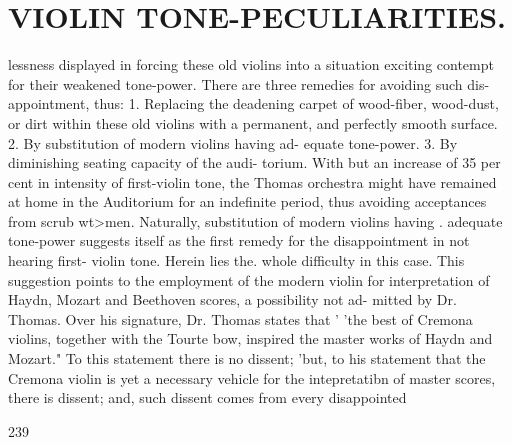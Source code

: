 \documentclass{article}
\begin{document}
\section*{VIOLIN TONE-PECULIARITIES.}
lessness displayed in forcing these old violins into a situation exciting contempt for their weakened tone-power. There are three remedies for avoiding such dis- appointment, thus: 1. Replacing the deadening carpet of wood-fiber, wood-dust, or dirt within these old violins with a permanent, and perfectly smooth surface. 2. By substitution of modern violins having ad- equate tone-power. 3. By diminishing seating capacity of the audi- torium. With but an increase of 35 per cent in intensity of first-violin tone, the Thomas orchestra might have remained at home in the Auditorium for an indefinite period, thus avoiding acceptances from scrub wt>men. Naturally, substitution of modern violins having . adequate tone-power suggests itself as the first remedy for the disappointment in not hearing first- violin tone. Herein lies the. whole difficulty in this case. This suggestion points to the employment of the modern violin for interpretation of Haydn, Mozart and Beethoven scores, a possibility not ad- mitted by Dr. Thomas. Over his signature, Dr. Thomas states that ' 'the best of Cremona violins, together with the Tourte bow, inspired the master works of Haydn and Mozart." To this statement there is no dissent; 'but, to his statement that the Cremona violin is yet a necessary vehicle for the intepretatibn of master scores, there is dissent; and, such dissent comes from every disappointed

239
\end{document}
